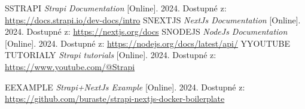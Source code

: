 \documentclass[12pt, a4paper,
openright
]{report}
\begin{document}
    \renewcommand{\bibname}{Seznam použitých zdrojů}
	\begin{thebibliography}{99}
		\bibitem SSTRAPI \textit{Strapi Documentation} [Online]. 2024. Dostupné z: \url{https://docs.strapi.io/dev-docs/intro}
        \bibitem SNEXTJS \textit{NextJs Documentation} [Online]. 2024. Dostupné z: \url{https://nextjs.org/docs}
        \bibitem SNODEJS \textit{NodeJs Documentation} [Online]. 2024. Dostupné z: \url{https://nodejs.org/docs/latest/api/}
        \bibitem YYOUTUBE TUTORIALY \textit{Strapi tutorials} [Online]. 2024. Dostupné z: \url{https://www.youtube.com/@Strapi}
        
        \bibitem EEXAMPLE \textit{Strapi+NextJs Example} [Online]. 2024. Dostupné z: \url{https://github.com/buraste/strapi-nextjs-docker-boilerplate}
		
	\end{thebibliography}
	
	
	
	\appendix %
	
	[\vspace{-22pt}] %
	
	
	




	
	

	
	
\end{document}
